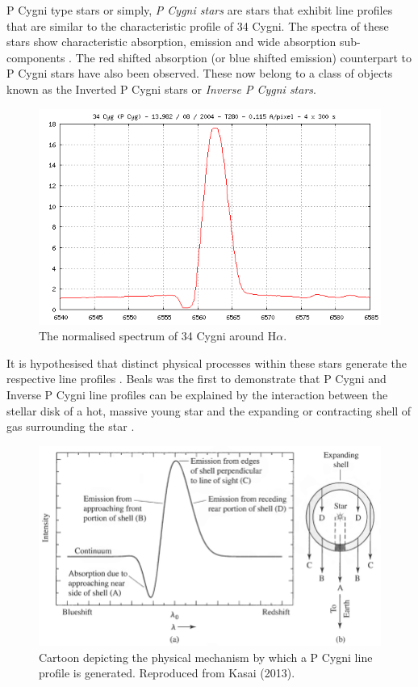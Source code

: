 P Cygni type stars or simply, \emph{P Cygni stars} are stars that exhibit line profiles that are similar to the characteristic profile of 34 Cygni. The spectra of these stars show characteristic absorption, emission and wide absorption sub-components \cite{zhang2021catalog}. The red shifted absorption (or blue shifted emission) counterpart to P Cygni stars have also been observed. These now belong to a class of objects known as the Inverted P Cygni stars or \emph{Inverse P Cygni stars}. 

\begin{figure}[t]
\centering
\includegraphics[scale=.40]{figures/34cygni.png}
\caption{The normalised spectrum of 34 Cygni around H$\alpha$.}
\end{figure}

It is hypothesised that distinct physical processes within these stars generate the respective line profiles \cite{hou2016catalog}. Beals was the first to demonstrate that P Cygni and Inverse P Cygni line profiles can be explained by the interaction between the stellar disk of a hot, massive young star and the expanding or contracting shell of gas surrounding the star \cite{1953PDAO....9....1B}. 

\begin{figure}[h]
\centering
\includegraphics[scale=.40]{figures/expandingpcygni.png}
\caption{Cartoon depicting the physical mechanism by which a P Cygni line profile is generated. Reproduced from Kasai (2013)\cite{kasai2013type}.}
\end{figure}

